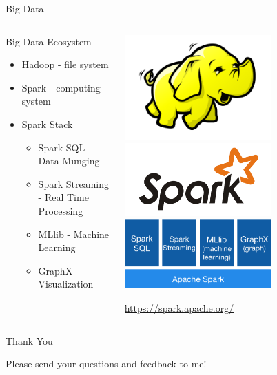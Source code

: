 \documentclass[10pt]{beamer}
\begin{document}
    \begin{frame}{Big Data}
      \begin{columns}
        \begin{column}[T]{0.48\textwidth}
          \begin{block}{Big Data Ecosystem}
            \begin{itemize}
              \item<1-> Hadoop - file system
              \item<2-> Spark - computing system
              \item<3-> Spark Stack
                \begin{itemize}
                  \item<4-> Spark SQL - Data Munging
                  \item<4-> Spark Streaming - Real Time Processing
                  \item<4-> MLlib - Machine Learning
                  \item<4-> GraphX - Visualization
                \end{itemize}
            \end{itemize}
          \end{block}
        \end{column}
        \begin{column}[T]{0.48\textwidth}
          \begin{overprint}
            \includegraphics[width=160pt]{../graphs/logo/hadoop}
            \includegraphics[width=160pt]{../graphs/logo/spark}
            \includegraphics[width=160pt]{../graphs/logo/spark-stack}
            
            \centerline{\footnotesize \url{https://spark.apache.org/}}
          \end{overprint}
        \end{column}   
      \end{columns}
    \end{frame}

    \begin{frame}{Thank You}
      \centerline{\large Please send your questions and feedback to me!}
    \end{frame}
\end{document}
